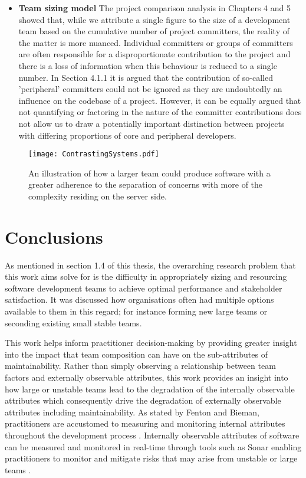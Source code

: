 \begin{itemize}
\item  \textbf{Team sizing model} The project comparison analysis in Chapters 4 and 5 showed that, while we attribute a single figure to the size of a development team based on the cumulative number of project committers, the reality of the matter is more nuanced. Individual committers or groups of committers are often responsible for a disproportionate contribution to the project and there is a loss of information when this behaviour is reduced to a single number. In Section 4.1.1 it is argued that the contribution of so-called 'peripheral' committers could not be ignored as they are undoubtedly an influence on the codebase of a project. However, it can be equally argued that not quantifying or factoring in the nature of the committer contributions does not allow us to draw a potentially important distinction between projects with differing proportions of core and peripheral developers. 

\end{itemize}

\begin{figure}[htbp!] 
\centering
\texttt{[image: ContrastingSystems.pdf]}
\caption{An illustration of how a larger team could produce software with a greater adherence to the separation of concerns with more of the complexity residing on the server side.}
\label{fig:ContrastingSystems}
\end{figure}

\section{Conclusions} %
As mentioned in section 1.4 of this thesis, the overarching research problem that this work aims solve for is the difficulty in appropriately sizing and resourcing software development teams to achieve optimal performance and stakeholder satisfaction. It was discussed how organisations often had multiple options available to them in this regard; for instance forming new large teams or seconding existing small stable teams. 

This work helps inform practitioner decision-making by providing greater insight into the impact that team composition can have on the sub-attributes of maintainability. Rather than simply observing a relationship between team factors and externally observable attributes, this work provides an insight into how large or unstable teams lead to the degradation of the internally observable attributes which consequently drive the degradation of externally observable attributes including maintainability. As stated by Fenton and Bieman, practitioners are accustomed to measuring and monitoring internal attributes throughout the development process \citep{fenton2014software}. Internally observable attributes of software can be measured and monitored in real-time through tools such as Sonar enabling practitioners to monitor and mitigate risks that may arise from unstable or large teams \citep{sonar}.

